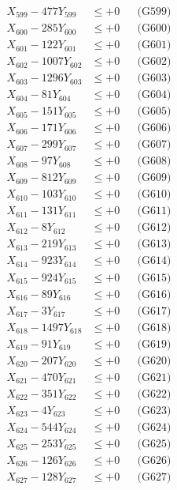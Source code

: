 \documentclass[a4paper,10pt]{article}
\begin{document}
{\begin{align}
X_{599} - 477Y_{599} &\leq +0 && \text{(G599)} \\
X_{600} - 285Y_{600} &\leq +0 && \text{(G600)} \\
\allowbreak
X_{601} - 122Y_{601} &\leq +0 && \text{(G601)} \\
X_{602} - 1007Y_{602} &\leq +0 && \text{(G602)} \\
X_{603} - 1296Y_{603} &\leq +0 && \text{(G603)} \\
X_{604} - 81Y_{604} &\leq +0 && \text{(G604)} \\
X_{605} - 151Y_{605} &\leq +0 && \text{(G605)} \\
X_{606} - 171Y_{606} &\leq +0 && \text{(G606)} \\
X_{607} - 299Y_{607} &\leq +0 && \text{(G607)} \\
X_{608} - 97Y_{608} &\leq +0 && \text{(G608)} \\
X_{609} - 812Y_{609} &\leq +0 && \text{(G609)} \\
X_{610} - 103Y_{610} &\leq +0 && \text{(G610)} \\
\allowbreak
X_{611} - 131Y_{611} &\leq +0 && \text{(G611)} \\
X_{612} - 8Y_{612} &\leq +0 && \text{(G612)} \\
X_{613} - 219Y_{613} &\leq +0 && \text{(G613)} \\
X_{614} - 923Y_{614} &\leq +0 && \text{(G614)} \\
X_{615} - 924Y_{615} &\leq +0 && \text{(G615)} \\
X_{616} - 89Y_{616} &\leq +0 && \text{(G616)} \\
X_{617} - 3Y_{617} &\leq +0 && \text{(G617)} \\
X_{618} - 1497Y_{618} &\leq +0 && \text{(G618)} \\
X_{619} - 91Y_{619} &\leq +0 && \text{(G619)} \\
X_{620} - 207Y_{620} &\leq +0 && \text{(G620)} \\
\allowbreak
X_{621} - 470Y_{621} &\leq +0 && \text{(G621)} \\
X_{622} - 351Y_{622} &\leq +0 && \text{(G622)} \\
X_{623} - 4Y_{623} &\leq +0 && \text{(G623)} \\
X_{624} - 544Y_{624} &\leq +0 && \text{(G624)} \\
X_{625} - 253Y_{625} &\leq +0 && \text{(G625)} \\
X_{626} - 126Y_{626} &\leq +0 && \text{(G626)} \\
X_{627} - 128Y_{627} &\leq +0 && \text{(G627)} \\

\end{align}}
\end{document}
